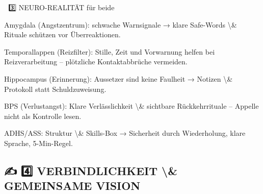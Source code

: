 🧠 3️⃣ NEURO-REALITÄT für beide

Amygdala (Angstzentrum): schwache Warnsignale → klare Safe-Words \textbackslash{}& Rituale schützen vor Überreaktionen.

Temporallappen (Reizfilter): Stille, Zeit und Vorwarnung helfen bei Reizverarbeitung -- plötzliche Kontaktabbrüche vermeiden.

Hippocampus (Erinnerung): Aussetzer sind keine Faulheit → Notizen \textbackslash{}& Protokoll statt Schuldzuweisung.

BPS (Verlustangst): Klare Verlässlichkeit \textbackslash{}& sichtbare Rückkehrrituale -- Appelle nicht als Kontrolle lesen.

ADHS/ASS: Struktur \textbackslash{}& Skills-Box → Sicherheit durch Wiederholung, klare Sprache, 5-Min-Regel.

\subsection{✍️ 4️⃣ VERBINDLICHKEIT \textbackslash{}& GEMEINSAME VISION}

